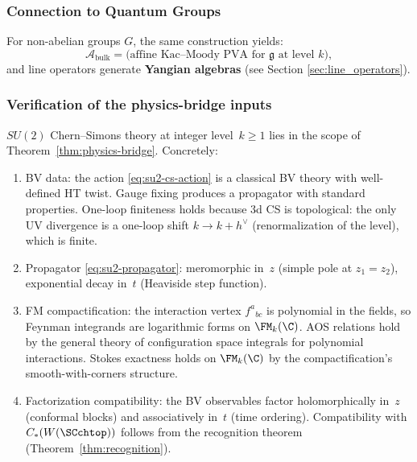\subsubsection{Connection to Quantum Groups}

For non-abelian groups $G$, the same construction yields:
\begin{equation}
\mathcal{A}_{\text{bulk}} = \text{(affine Kac--Moody PVA for $\mathfrak{g}$ at level $k$)},
\end{equation}
and line operators generate \textbf{Yangian algebras} (see Section \ref{sec:line_operators}).


\subsubsection{Verification of the physics-bridge inputs}

\begin{proposition}
$SU(2)$ Chern--Simons theory at integer level~$k \geq 1$ lies
in the scope of Theorem~\ref{thm:physics-bridge}. Concretely:
\begin{enumerate}[label=\textup{(H\arabic*)}]
\item BV data: the action \eqref{eq:su2-cs-action} is a
 classical BV theory with well-defined HT twist. Gauge fixing
 produces a propagator with standard properties. One-loop
 finiteness holds because 3d CS is topological: the only
 UV divergence is a one-loop shift $k \to k + h^\vee$
 (renormalization of the level), which is finite.
\item Propagator \eqref{eq:su2-propagator}: meromorphic in~$z$
 (simple pole at $z_1 = z_2$), exponential decay in~$t$
 (Heaviside step function).
\item FM compactification: the interaction vertex $f^a{}_{bc}$
 is polynomial in the fields, so Feynman integrands are
 logarithmic forms on $\FM_k(\C)$. AOS relations hold by the
 general theory of configuration space integrals for
 polynomial interactions. Stokes exactness holds on
 $\FM_k(\C)$ by the compactification's smooth-with-corners
 structure.
\item Factorization compatibility: the BV observables factor
 holomorphically in~$z$ (conformal blocks) and associatively
 in~$t$ (time ordering). Compatibility with
 $C_\ast(W(\SCchtop))$ follows from the recognition theorem
 (Theorem~\ref{thm:recognition}).
\end{enumerate}
\end{proposition}

